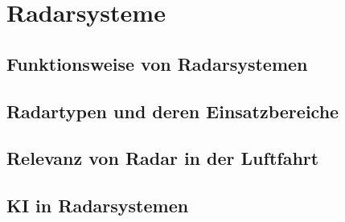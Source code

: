 \part{Radarsysteme}
\chapter{Funktionsweise von Radarsystemen} 

\chapter{Radartypen und deren Einsatzbereiche} 

\chapter{Relevanz von Radar in der Luftfahrt} 

\chapter{\ac{KI} in Radarsystemen} 
